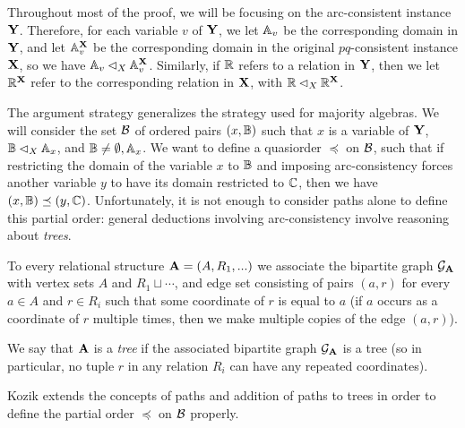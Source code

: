 \documentclass[letterpaper,11pt]{article}
\begin{document}
Throughout most of the proof, we will be focusing on the arc-consistent instance $\mathbf{Y}$. Therefore, for each variable $v$ of $\mathbf{Y}$, we let $\mathbb{A}_v$ be the corresponding domain in $\mathbf{Y}$, and let $\mathbb{A}_v^{\mathbf{X}}$ be the corresponding domain in the original $pq$-consistent instance $\mathbf{X}$, so we have $\mathbb{A}_v \lhd_X \mathbb{A}_v^{\mathbf{X}}$. Similarly, if $\mathbb{R}$ refers to a relation in $\mathbf{Y}$, then we let $\mathbb{R}^{\mathbf{X}}$ refer to the corresponding relation in $\mathbf{X}$, with $\mathbb{R} \lhd_X \mathbb{R}^{\mathbf{X}}$.

The argument strategy generalizes the strategy used for majority algebras. We will consider the set $\mathcal{B}$ of ordered pairs $(x,\mathbb{B})$ such that $x$ is a variable of $\mathbf{Y}$, $\mathbb{B} \lhd_X \mathbb{A}_x$, and $\mathbb{B} \ne \emptyset, \mathbb{A}_x$. We want to define a quasiorder $\preceq$ on $\mathcal{B}$, such that if restricting the domain of the variable $x$ to $\mathbb{B}$ and imposing arc-consistency forces another variable $y$ to have its domain restricted to $\mathbb{C}$, then we have $(x,\mathbb{B}) \preceq (y,\mathbb{C})$. Unfortunately, it is not enough to consider paths alone to define this partial order: general deductions involving arc-consistency involve reasoning about \emph{trees}.

\begin{defn} To every relational structure $\mathbf{A} = (A, R_1, ...)$ we associate the bipartite graph $\mathcal{G}_{\mathbf{A}}$ with vertex sets $A$ and $R_1 \sqcup \cdots$, and edge set consisting of pairs $(a,r)$ for every $a \in A$ and $r \in R_i$ such that some coordinate of $r$ is equal to $a$ (if $a$ occurs as a coordinate of $r$ multiple times, then we make multiple copies of the edge $(a,r)$).

We say that $\mathbf{A}$ is a \emph{tree} if the associated bipartite graph $\mathcal{G}_{\mathbf{A}}$ is a tree (so in particular, no tuple $r$ in any relation $R_i$ can have any repeated coordinates).
\end{defn}

Kozik \cite{pq-consistency} extends the concepts of paths and addition of paths to trees in order to define the partial order $\preceq$ on $\mathcal{B}$ properly.
\end{document}
